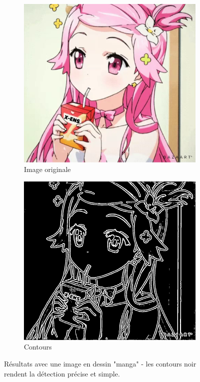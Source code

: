 \documentclass[hidelinks,11pt]{article}
\theoremstyle{mytheoremstyle}
\theoremstyle{mytheoremstyle}
\theoremstyle{myproblemstyle}
\begin{document}
    \begin{figure}[h]
        \centering
        \begin{subfigure}[b]{0.4\textwidth}
            \centering
            \includegraphics[width=\textwidth]{figs/fig9a}
            \caption{Image originale}
        \end{subfigure}
        \hfill
        \begin{subfigure}[b]{0.4\textwidth}
            \centering
            \includegraphics[width=\textwidth]{figs/fig9b}
            \caption{Contours}
        \end{subfigure}
           \caption{Résultats avec une image en dessin "manga" - les contours noir rendent la détection précise et simple.}
    \end{figure}
\end{document}
